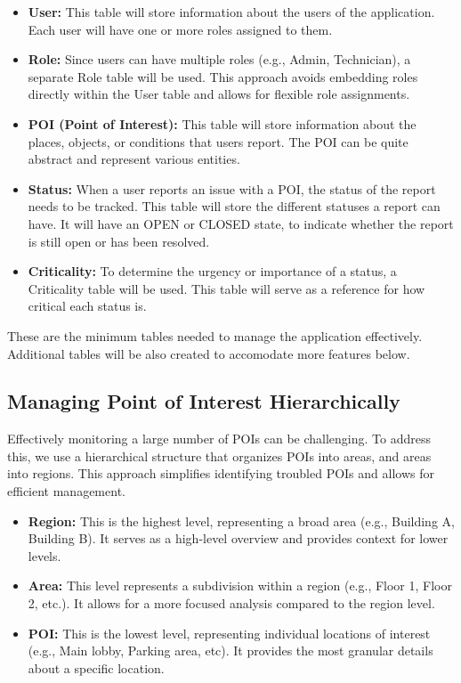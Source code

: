 \begin{itemize}
    \item \textbf{User:} This table will store information about the users of the application. Each user will have one or more roles assigned to them.
    \item \textbf{Role:} Since users can have multiple roles (e.g., Admin, Technician), a separate Role table will be used. This approach avoids embedding roles directly within the User table and allows for flexible role assignments.
    \item \textbf{POI (Point of Interest):} This table will store information about the places, objects, or conditions that users report. The POI can be quite abstract and represent various entities.
    \item \textbf{Status:} When a user reports an issue with a POI, the status of the report needs to be tracked. This table will store the different statuses a report can have. It will have an OPEN or CLOSED state, to indicate whether the report is still open or has been resolved.
    \item \textbf{Criticality:} To determine the urgency or importance of a status, a Criticality table will be used. This table will serve as a reference for how critical each status is.
\end{itemize}

These are the minimum tables needed to manage the application effectively. Additional tables will be also created to accomodate more features below.

\subsection{Managing Point of Interest Hierarchically}
\label{subsec:internship_experience:managing_poi}

Effectively monitoring a large number of POIs can be challenging. To address this, we use a hierarchical structure that organizes POIs into areas, and areas into regions. This approach simplifies identifying troubled POIs and allows for efficient management.

\begin{itemize}
    \item \textbf{Region:} This is the highest level, representing a broad area (e.g., Building A, Building B). It serves as a high-level overview and provides context for lower levels.
    \item \textbf{Area:} This level represents a subdivision within a region (e.g., Floor 1, Floor 2, etc.). It allows for a more focused analysis compared to the region level.
    \item \textbf{POI:} This is the lowest level, representing individual locations of interest (e.g., Main lobby, Parking area, etc). It provides the most granular details about a specific location.
\end{itemize}


